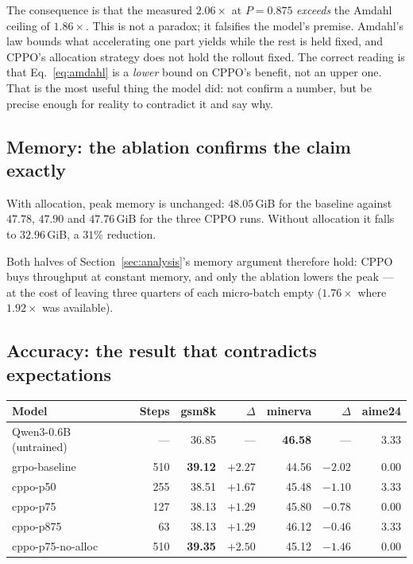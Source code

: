 \documentclass[11pt,a4paper]{article}
\begin{document}
The consequence is that the measured $2.06\times$ at $P = 0.875$
\emph{exceeds} the Amdahl ceiling of $1.86\times$. This is not a paradox; it
falsifies the model's premise. Amdahl's law bounds what accelerating one part
yields while the rest is held fixed, and CPPO's allocation strategy does not
hold the rollout fixed. The correct reading is that
Eq.~\eqref{eq:amdahl} is a \emph{lower} bound on CPPO's benefit, not an upper
one. That is the most useful thing the model did: not confirm a number, but be
precise enough for reality to contradict it and say why.

\subsection{Memory: the ablation confirms the claim exactly}
\label{sec:results-memory}

With allocation, peak memory is unchanged: $48.05$\,GiB for the baseline
against $47.78$, $47.90$ and $47.76$\,GiB for the three CPPO runs. Without
allocation it falls to $32.96$\,GiB, a $31\%$ reduction.

Both halves of Section~\ref{sec:analysis}'s memory argument therefore hold:
CPPO buys throughput at constant memory, and only the ablation lowers the peak
--- at the cost of leaving three quarters of each micro-batch empty
($1.76\times$ where $1.92\times$ was available).

\subsection{Accuracy: the result that contradicts expectations}
\label{sec:results-accuracy}

\begin{center}
\begin{tabular}{@{}lrrrrrr@{}}
\toprule
Model & Steps & gsm8k & $\Delta$ & minerva & $\Delta$ & aime24 \\
\midrule
Qwen3-0.6B (untrained) & --- & 36.85 & --- & \textbf{46.58} & --- & 3.33 \\
grpo-baseline & 510 & \textbf{39.12} & $+2.27$ & 44.56 & $\mathbf{-2.02}$ & 0.00 \\
cppo-p50 & 255 & 38.51 & $+1.67$ & 45.48 & $-1.10$ & 3.33 \\
cppo-p75 & 127 & 38.13 & $+1.29$ & 45.80 & $-0.78$ & 0.00 \\
cppo-p875 & \phantom{0}63 & 38.13 & $+1.29$ & 46.12 & $-0.46$ & 3.33 \\
cppo-p75-no-alloc & 510 & \textbf{39.35} & $+2.50$ & 45.12 & $-1.46$ & 0.00 \\
\bottomrule
\end{tabular}
\end{center}
\end{document}
